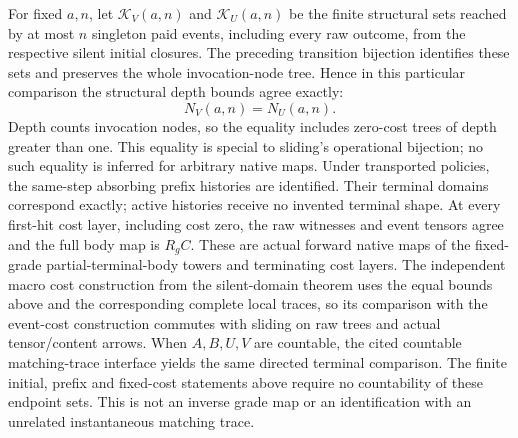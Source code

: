\documentclass[11pt]{article}
\begin{document}
For fixed $a,n$, let $\mathcal K_V(a,n)$ and $\mathcal K_U(a,n)$ be the
finite structural sets reached by at most $n$ singleton paid events,
including every raw outcome, from the respective silent initial closures.
The preceding transition bijection identifies these sets and preserves
the whole invocation-node tree. Hence in this particular comparison the
structural depth bounds agree exactly:
\[
 N_V(a,n)=N_U(a,n).
\]
Depth counts invocation nodes, so the equality includes zero-cost trees of
depth greater than one. This equality is special to sliding's operational
bijection; no such equality is inferred for arbitrary native maps.
Under transported policies, the same-step absorbing prefix histories are
identified. Their terminal domains correspond exactly; active histories
receive no invented terminal shape. At every first-hit cost layer, including
cost zero, the raw witnesses and event tensors agree and the full body map
is $R_g C$. These are actual forward native maps of the fixed-grade
partial-terminal-body towers and terminating cost layers. The independent
macro cost construction from the silent-domain theorem uses the equal
bounds above and the corresponding complete local traces, so its comparison
with the event-cost construction commutes with sliding on raw trees and
actual tensor/content arrows. When $A,B,U,V$ are countable, the cited countable matching-trace
interface yields the same directed terminal comparison. The finite initial,
prefix and fixed-cost statements above require no countability of these
endpoint sets. This is not an inverse grade map or an
identification with an unrelated instantaneous matching trace.
\end{document}
